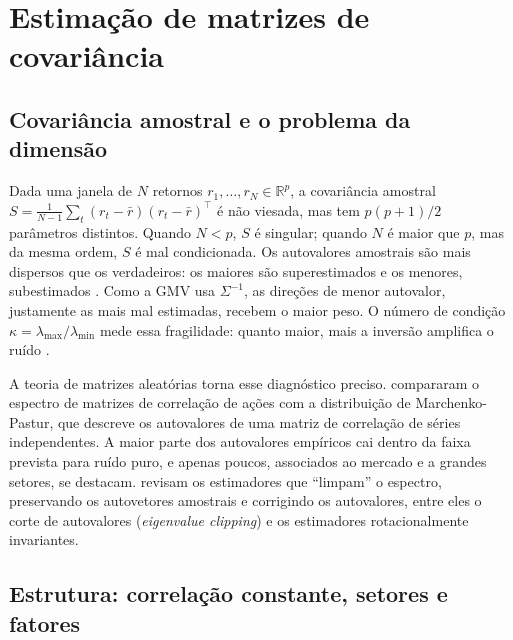 \section{Estimação de matrizes de covariância}
\label{sec:estimacao}

\subsection{Covariância amostral e o problema da dimensão}

Dada uma janela de $N$ retornos $r_1,\dots,r_N\in\mathbb R^p$, a covariância amostral
$S=\frac{1}{N-1}\sum_t (r_t-\bar r)(r_t-\bar r)^\top$ é não viesada, mas tem $p(p+1)/2$ parâmetros
distintos. Quando $N<p$, $S$ é singular; quando $N$ é maior que $p$, mas da mesma ordem, $S$ é mal
condicionada. Os autovalores amostrais são mais dispersos que os verdadeiros: os maiores são
superestimados e os menores, subestimados \citep{ledoit2004jmva}. Como a GMV usa $\Sigma^{-1}$, as
direções de menor autovalor, justamente as mais mal estimadas, recebem o maior peso. O número de
condição $\kappa=\lambda_{\max}/\lambda_{\min}$ mede essa fragilidade: quanto maior, mais a inversão
amplifica o ruído \citep{lopezdeprado2016,lopezdeprado2020}.

A teoria de matrizes aleatórias torna esse diagnóstico preciso. \citet{laloux1999} compararam o
espectro de matrizes de correlação de ações com a distribuição de Marchenko-Pastur, que descreve os
autovalores de uma matriz de correlação de séries independentes. A maior parte dos autovalores
empíricos cai dentro da faixa prevista para ruído puro, e apenas poucos, associados ao mercado e a
grandes setores, se destacam. \citet{bun2017} revisam os estimadores que ``limpam'' o espectro,
preservando os autovetores amostrais e corrigindo os autovalores, entre eles o corte de autovalores
(\emph{eigenvalue clipping}) e os estimadores rotacionalmente invariantes.

\subsection{Estrutura: correlação constante, setores e fatores}

